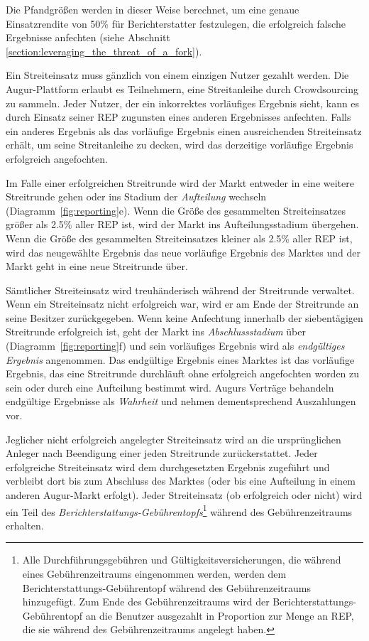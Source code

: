 \documentclass[floatfix,reprint,nofootinbib,amsmath,amssymb,epsfig,pre,floats,letterpaper,groupedaffiliation]{revtex4-1}
\theoremstyle{definition}
\theoremstyle{definition}
\theoremstyle{definition}
\begin{document}
Die Pfandgrößen werden in dieser Weise berechnet, um eine genaue Einsatzrendite von 50\% für Berichterstatter festzulegen, die erfolgreich falsche Ergebnisse anfechten (siehe Abschnitt \ref{section:leveraging_the_threat_of_a_fork}).

Ein Streiteinsatz muss gänzlich von einem einzigen Nutzer gezahlt werden. Die Augur-Plattform erlaubt es Teilnehmern, eine Streitanleihe durch Crowdsourcing zu sammeln. Jeder Nutzer, der ein inkorrektes vorläufiges Ergebnis sieht, kann es durch Einsatz seiner REP zugunsten eines anderen Ergebnisses anfechten. Falls ein anderes Ergebnis als das vorläufige Ergebnis einen ausreichenden Streiteinsatz erhält, um seine Streitanleihe zu decken, wird das derzeitige vorläufige Ergebnis erfolgreich angefochten.

Im Falle einer erfolgreichen Streitrunde wird der Markt entweder in eine weitere Streitrunde gehen oder ins Stadium der \textit{Aufteilung} wechseln (Diagramm~\ref{fig:reporting}e). Wenn die Größe des gesammelten Streiteinsatzes größer als 2.5\% aller REP ist, wird der Markt ins Aufteilungsstadium übergehen. Wenn die Größe des gesammelten Streiteinsatzes kleiner als 2.5\% aller REP ist, wird das neugewählte Ergebnis das neue vorläufige Ergebnis des Marktes und der Markt geht in eine neue Streitrunde über.

Sämtlicher Streiteinsatz wird treuhänderisch während der Streitrunde verwaltet. Wenn ein Streiteinsatz nicht erfolgreich war, wird er am Ende der Streitrunde an seine Besitzer zurückgegeben. Wenn keine Anfechtung innerhalb der siebentägigen Streitrunde erfolgreich ist, geht der Markt ins \textit{Abschlussstadium} über (Diagramm~\ref{fig:reporting}f) und sein vorläufiges Ergebnis wird als \textit{endgültiges Ergebnis} angenommen. Das endgültige Ergebnis eines Marktes ist das vorläufige Ergebnis, das eine Streitrunde durchläuft ohne erfolgreich angefochten worden zu sein oder durch eine Aufteilung bestimmt wird. Augurs Verträge behandeln endgültige Ergebnisse als \textit{Wahrheit} und nehmen dementsprechend Auszahlungen vor.

Jeglicher nicht erfolgreich angelegter Streiteinsatz wird an die ursprünglichen Anleger nach Beendigung einer jeden Streitrunde zurückerstattet. Jeder erfolgreiche Streiteinsatz wird dem durchgesetzten Ergebnis zugeführt und verbleibt dort bis zum Abschluss des Marktes (oder bis eine Aufteilung in einem anderen Augur-Markt erfolgt). Jeder Streiteinsatz (ob erfolgreich oder nicht) wird ein Teil des \textit{Berichterstattungs-Gebührentopfs}\footnote{Alle Durchführungsgebühren und Gültigkeitsversicherungen, die während eines Gebührenzeitraums eingenommen werden, werden dem Berichterstattungs-Gebührentopf während des Gebührenzeitraums hinzugefügt. Zum Ende des Gebührenzeitraums wird der Berichterstattungs-Gebührentopf an die Benutzer ausgezahlt in Proportion zur Menge an REP, die sie während des Gebührenzeitraums angelegt haben.} während des Gebührenzeitraums erhalten.
\end{document}
